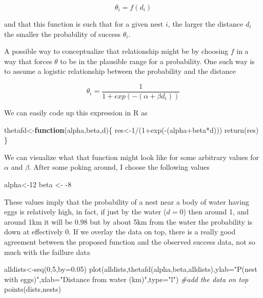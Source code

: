 \documentclass[
]{book}
\newenvironment{Shaded}{\begin{snugshade}}{\end{snugshade}}
\newcommand{\AttributeTok}[1]{\textcolor[rgb]{0.77,0.63,0.00}{#1}}
\newcommand{\CommentTok}[1]{\textcolor[rgb]{0.56,0.35,0.01}{\textit{#1}}}
\newcommand{\ControlFlowTok}[1]{\textcolor[rgb]{0.13,0.29,0.53}{\textbf{#1}}}
\newcommand{\DecValTok}[1]{\textcolor[rgb]{0.00,0.00,0.81}{#1}}
\newcommand{\FloatTok}[1]{\textcolor[rgb]{0.00,0.00,0.81}{#1}}
\newcommand{\FunctionTok}[1]{\textcolor[rgb]{0.00,0.00,0.00}{#1}}
\newcommand{\NormalTok}[1]{#1}
\newcommand{\OtherTok}[1]{\textcolor[rgb]{0.56,0.35,0.01}{#1}}
\newcommand{\SpecialCharTok}[1]{\textcolor[rgb]{0.00,0.00,0.00}{#1}}
\newcommand{\StringTok}[1]{\textcolor[rgb]{0.31,0.60,0.02}{#1}}
\begin{document}
\[\theta_i=f(d_i)\]

and that this function is such that for a given nest \(i\), the larger the distance \(d_i\) the smaller the probability of success \(\theta_i\).

A possible way to conceptualize that relationship might be by choosing \(f\) in a way that forces \(\theta\) to be in the plausible range for a probability. One such way is to assume a logistic relationship between the probability and the distance

\[\theta_i=\frac{1}{1+exp(-(\alpha+\beta d_i))}\]

We can easily code up this expression in R as

\begin{Shaded}
\begin{Highlighting}[]
\NormalTok{thetafd}\OtherTok{\textless{}{-}}\ControlFlowTok{function}\NormalTok{(alpha,beta,d)\{}
\NormalTok{  res}\OtherTok{\textless{}{-}}\DecValTok{1}\SpecialCharTok{/}\NormalTok{(}\DecValTok{1}\SpecialCharTok{+}\FunctionTok{exp}\NormalTok{(}\SpecialCharTok{{-}}\NormalTok{(alpha}\SpecialCharTok{+}\NormalTok{beta}\SpecialCharTok{*}\NormalTok{d)))}
  \FunctionTok{return}\NormalTok{(res)}
\NormalTok{\}}
\end{Highlighting}
\end{Shaded}

We can visualize what that function might look like for some arbitrary values for \(\alpha\) and \(\beta\). After some poking around, I choose the following values

\begin{Shaded}
\begin{Highlighting}[]
\NormalTok{alpha}\OtherTok{\textless{}{-}}\DecValTok{12}
\NormalTok{beta }\OtherTok{\textless{}{-}} \SpecialCharTok{{-}}\DecValTok{8}
\end{Highlighting}
\end{Shaded}

These values imply that the probability of a nest near a body of water having eggs is relatively high, in fact, if just by the water (\(d=0\)) then around 1, and around 1km it will be 0.98 but by about 5km from the water the probability is down at effectively 0. If we overlay the data on top, there is a really good agreement between the proposed function and the observed success data, not so much with the faillure data

\begin{Shaded}
\begin{Highlighting}[]
\NormalTok{alldists}\OtherTok{\textless{}{-}}\FunctionTok{seq}\NormalTok{(}\DecValTok{0}\NormalTok{,}\DecValTok{5}\NormalTok{,}\AttributeTok{by=}\FloatTok{0.05}\NormalTok{)}
\FunctionTok{plot}\NormalTok{(alldists,}\FunctionTok{thetafd}\NormalTok{(alpha,beta,alldists),}\AttributeTok{ylab=}\StringTok{"P(nest with eggs)"}\NormalTok{,}\AttributeTok{xlab=}\StringTok{"Distance from water (km)"}\NormalTok{,}\AttributeTok{type=}\StringTok{"l"}\NormalTok{)}
\CommentTok{\#add the data on top}
\FunctionTok{points}\NormalTok{(dists,nests)}
\end{Highlighting}
\end{Shaded}
\end{document}
